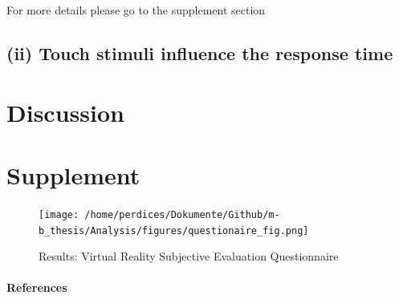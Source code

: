 \documentclass[12pt,oneside,openright]{report}
\begin{document}
    For more details please go to the supplement section 

    
    \subsection*{(ii) Touch stimuli influence the response time}
\section*{Discussion}



\pagebreak
\section*{Supplement}
    \begin{figure}[H]
        \centering
        \texttt{[image: /home/perdices/Dokumente/Github/m-b\_thesis/Analysis/figures/questionaire\_fig.png]}
        \caption{Results: Virtual Reality Subjective Evaluation Questionnaire}
        \label{fig:mesh2}
    \end{figure}
  

\pagebreak
\paragraph{\textbf{References}}
\printbibliography[heading=none]
\end{document}
